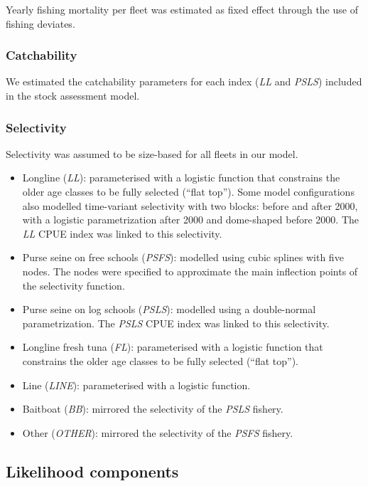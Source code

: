 \documentclass[
]{scrartcl}
\begin{document}
Yearly fishing mortality per fleet was estimated as fixed effect through
the use of fishing deviates.

\subsubsection{Catchability}\label{catchability}

We estimated the catchability parameters for each index (\emph{LL} and
\emph{PSLS}) included in the stock assessment model.

\subsubsection{Selectivity}\label{selectivity}

Selectivity was assumed to be size-based for all fleets in our model.

\begin{itemize}
\item
  Longline (\emph{LL}): parameterised with a logistic function that
  constrains the older age classes to be fully selected (``flat top'').
  Some model configurations also modelled time-variant selectivity with
  two blocks: before and after 2000, with a logistic parametrization
  after 2000 and dome-shaped before 2000. The \emph{LL} CPUE index was
  linked to this selectivity.
\item
  Purse seine on free schools (\emph{PSFS}): modelled using cubic
  splines with five nodes. The nodes were specified to approximate the
  main inflection points of the selectivity function.
\item
  Purse seine on log schools (\emph{PSLS}): modelled using a
  double-normal parametrization. The \emph{PSLS} CPUE index was linked
  to this selectivity.
\item
  Longline fresh tuna (\emph{FL}): parameterised with a logistic
  function that constrains the older age classes to be fully selected
  (``flat top'').
\item
  Line (\emph{LINE}): parameterised with a logistic function.
\item
  Baitboat (\emph{BB}): mirrored the selectivity of the \emph{PSLS}
  fishery.
\item
  Other (\emph{OTHER}): mirrored the selectivity of the \emph{PSFS}
  fishery.
\end{itemize}

\subsection{Likelihood components}\label{likelihood-components}
\end{document}
